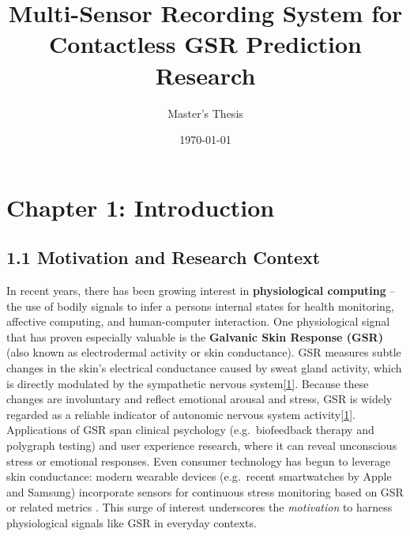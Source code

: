 \documentclass[12pt,a4paper]{article}
\title{Multi-Sensor Recording System for Contactless GSR Prediction Research}
\author{Master's Thesis}
\date{\today}
\begin{document}
\maketitle
\newpage

\tableofcontents
\newpage

\section{Chapter 1: Introduction}\label{chapter-1-introduction}

\subsection{1.1 Motivation and Research Context}\label{motivation-and-research-context}

In recent years, there has been growing interest in \textbf{physiological computing} -- the use of bodily signals to infer a person\textquotesingle s internal states for health monitoring, affective computing, and human-computer interaction. One physiological signal that has proven especially valuable is the \textbf{Galvanic Skin Response (GSR)} (also known as electrodermal activity or skin conductance). GSR measures subtle changes in the skin's electrical conductance caused by sweat gland activity, which is directly modulated by the sympathetic nervous system\href{https://pmc.ncbi.nlm.nih.gov/articles/PMC8187483/\#:~:text=Galvanic\%20skin\%20response\%20,conditions\%20which\%20recent\%20studies\%20have}{{[}1{]}}. Because these changes are involuntary and reflect emotional arousal and stress, GSR is widely regarded as a reliable indicator of autonomic nervous system activity\href{https://pmc.ncbi.nlm.nih.gov/articles/PMC8187483/\#:~:text=Galvanic\%20skin\%20response\%20,conditions\%20which\%20recent\%20studies\%20have}{{[}1{]}}. Applications of GSR span clinical psychology (e.g.~biofeedback therapy and polygraph testing) and user experience research, where it can reveal unconscious stress or emotional responses. Even consumer technology has begun to leverage skin conductance: modern wearable devices (e.g.~recent smartwatches by Apple and Samsung) incorporate sensors for continuous stress monitoring based on GSR or related metrics \citep{AppliedSciences2020AffectiveComputing, PMC2021GSRStress}. This surge of interest underscores the \emph{motivation} to harness physiological signals like GSR in everyday contexts.
\end{document}
